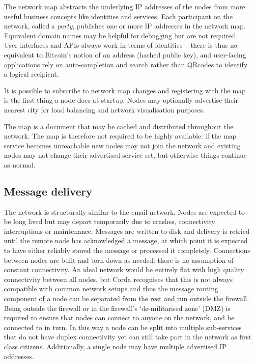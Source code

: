 \documentclass{article}
\begin{document}
The network map abstracts the underlying IP addresses of the nodes from more useful business concepts like identities
and services. Each participant on the network, called a \emph{party}, publishes one or more IP addresses in the
network map. Equivalent domain names may be helpful for debugging but are not required. User interfaces and APIs
always work in terms of identities -- there is thus no equivalent to Bitcoin's notion of an address (hashed public key),
and user-facing applications rely on auto-completion and search rather than QRcodes to identify a logical recipient.

It is possible to subscribe to network map changes and registering with the map is the first thing a node does at
startup. Nodes may optionally advertise their nearest city for load balancing and network visualisation purposes.

The map is a document that may be cached and distributed throughout the network. The map is therefore not required
to be highly available: if the map service becomes unreachable new nodes may not join the network and existing nodes
may not change their advertised service set, but otherwise things continue as normal.

\subsection{Message delivery}

The network is structurally similar to the email network. Nodes are expected to be long lived but may depart
temporarily due to crashes, connectivity interruptions or maintenance. Messages are written to disk
and delivery is retried until the remote node has acknowledged a message, at which point it is expected to have
either reliably stored the message or processed it completely. Connections between nodes are built and torn down as
needed: there is no assumption of constant connectivity. An ideal network would be entirely flat with high quality
connectivity between all nodes, but Corda recognises that this is not always compatible with common network
setups and thus the message routing component of a node can be separated from the rest and run outside the firewall.
Being outside the firewall or in the firewall's `de-militarised zone' (DMZ) is required to ensure that nodes can
connect to anyone on the network, and be connected to in turn. In this way a node can be split into multiple
sub-services that do not have duplex connectivity yet can still take part in the network as first class citizens.
Additionally, a single node may have multiple advertised IP addresses.
\end{document}
